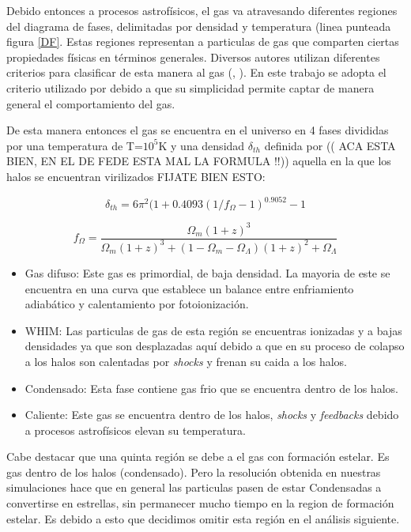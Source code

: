 Debido entonces a procesos astrof\'isicos, el gas va atravesando diferentes regiones del diagrama de fases, delimitadas por densidad y temperatura (linea punteada figura \ref{DF}. Estas regiones representan a particulas de gas que comparten ciertas propiedades f\'isicas en t\'erminos generales. Diversos autores utilizan diferentes criterios para clasificar de esta manera al gas (\cite{Schaal2016}, \cite{Martizzi2019}). En este trabajo se adopta el criterio utilizado por \citep{Huang2019} debido a que su simplicidad permite captar de manera general el comportamiento del gas. 

De esta manera entonces el gas se encuentra en el universo en 4 fases divididas por una temperatura  de  T=$10^{5}$K y una densidad $\delta_{th}$ definida por \citep{Kitayama1996} (( \citet{Dave2010} ACA ESTA BIEN, EN EL DE FEDE ESTA MAL LA FORMULA !!)) aquella en la que los halos se encuentran virilizados FIJATE BIEN ESTO:

\begin{equation}
    \delta_ {th}=6\pi^{2}(1+0.4093(1/f_{\Omega}-1)^{0.9052}-1
\end{equation}{}

\begin{equation}
    f_{\Omega}=\frac{\Omega_{m}(1+z)^{3}}{\Omega_{m}(1+z)^{3} + (1-\Omega_ {m} - \Omega_{\Lambda})(1+z)^{2} + \Omega_{\Lambda}}
\end{equation}{}
\begin{itemize}
    \item Gas difuso: Este gas es primordial, de baja densidad. La mayoria de este se encuentra en una curva que establece un balance entre enfriamiento adiab\'atico y calentamiento por fotoionizaci\'on. 
    \item WHIM: Las particulas de gas de esta regi\'on se encuentras ionizadas y a bajas densidades ya que son desplazadas aqu\'i debido a que en su proceso de colapso a los halos son calentadas por \textit{shocks} y frenan su caida a los halos.
    \item Condensado: Esta fase contiene gas frio que se encuentra dentro de los halos. 
    \item Caliente: Este gas se encuentra dentro de los halos, \textit{shocks} y \textit{feedbacks} debido a procesos astrof\'isicos elevan su temperatura. 
\end{itemize}{}
Cabe destacar que una quinta regi\'on se debe a el gas con formaci\'on estelar. Es gas dentro de los halos (condensado). Pero la resoluci\'on obtenida en nuestras simulaciones hace que en general las particulas pasen de estar Condensadas a convertirse en estrellas, sin permanecer mucho tiempo en la region de formaci\'on estelar. Es debido a esto que decidimos omitir esta regi\'on en el an\'alisis siguiente. 





